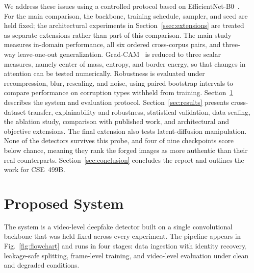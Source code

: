 \documentclass[journal,onecolumn]{IEEEtran}
\begin{document}
We address these issues using a controlled protocol based on EfficientNet-B0~\cite{tan2019efficientnet}. For the main comparison, the backbone, training schedule, sampler, and seed are held fixed; the architectural experiments in Section~\ref{ssec:extensions} are treated as separate extensions rather than part of this comparison. The main study measures in-domain performance, all six ordered cross-corpus pairs, and three-way leave-one-out generalization. Grad-CAM~\cite{selvaraju2017gradcam} is reduced to three scalar measures, namely center of mass, entropy, and border energy, so that changes in attention can be tested numerically. Robustness is evaluated under recompression, blur, rescaling, and noise, using paired bootstrap intervals to compare performance on corruption types withheld from training. Section~\ref{sec:proposed} describes the system and evaluation protocol. Section~\ref{sec:results} presents cross-dataset transfer, explainability and robustness, statistical validation, data scaling, the ablation study, comparison with published work, and architectural and objective extensions. The final extension also tests latent-diffusion manipulation. None of the detectors survives this probe, and four of nine checkpoints score below chance, meaning they rank the forged images as more authentic than their real counterparts. Section~\ref{sec:conclusion} concludes the report and outlines the work for CSE~499B.

\section{Proposed System}
\label{sec:proposed}

The system is a video-level deepfake detector built on a single convolutional
backbone that was held fixed across every experiment. The pipeline appears in
Fig.~\ref{fig:flowchart} and runs in four stages: data ingestion with identity
recovery, leakage-safe splitting, frame-level training, and video-level
evaluation under clean and degraded conditions.
\end{document}
